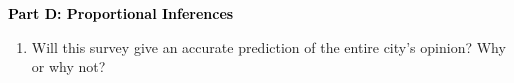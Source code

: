 \documentclass[12pt, letterpaper, fleqn]{article}
\newcommand{\blanklong}{\underline{\hspace{6.5cm}}}
\begin{document}
\newpage

\begin{tcolorbox}[colback=customteal!20]
\large\textcolor{black}{\textbf{Part D: Proportional Inferences}}
\end{tcolorbox}

\vspace{3mm}

\begin{enumerate}[itemsep=2.5cm, leftmargin=0.6cm, resume]
\item Will this survey give an accurate prediction of the entire city's opinion? Why or why not? \blanklong
\end{enumerate}
\end{document}

